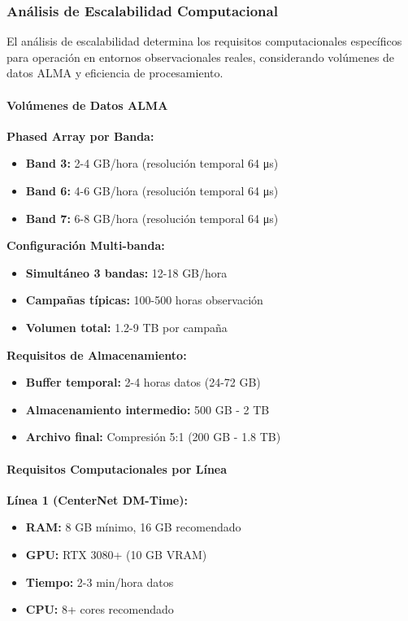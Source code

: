 \subsubsection{Análisis de Escalabilidad Computacional}

El análisis de escalabilidad determina los requisitos computacionales específicos para operación en entornos observacionales reales, considerando volúmenes de datos ALMA y eficiencia de procesamiento.

\paragraph{Volúmenes de Datos ALMA}

\textbf{Phased Array por Banda:}
\begin{itemize}
\item \textbf{Band 3:} 2-4 GB/hora (resolución temporal 64 μs)
\item \textbf{Band 6:} 4-6 GB/hora (resolución temporal 64 μs)
\item \textbf{Band 7:} 6-8 GB/hora (resolución temporal 64 μs)
\end{itemize}

\textbf{Configuración Multi-banda:}
\begin{itemize}
\item \textbf{Simultáneo 3 bandas:} 12-18 GB/hora
\item \textbf{Campañas típicas:} 100-500 horas observación
\item \textbf{Volumen total:} 1.2-9 TB por campaña
\end{itemize}

\textbf{Requisitos de Almacenamiento:}
\begin{itemize}
\item \textbf{Buffer temporal:} 2-4 horas datos (24-72 GB)
\item \textbf{Almacenamiento intermedio:} 500 GB - 2 TB
\item \textbf{Archivo final:} Compresión 5:1 (200 GB - 1.8 TB)
\end{itemize}

\paragraph{Requisitos Computacionales por Línea}

\textbf{Línea 1 (CenterNet DM-Time):}
\begin{itemize}
\item \textbf{RAM:} 8 GB mínimo, 16 GB recomendado
\item \textbf{GPU:} RTX 3080+ (10 GB VRAM)
\item \textbf{Tiempo:} 2-3 min/hora datos
\item \textbf{CPU:} 8+ cores recomendado
\end{itemize}

